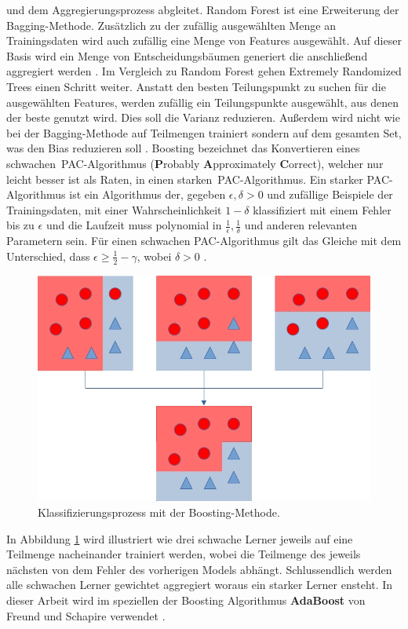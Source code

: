 und dem Aggregierungsprozess abgleitet.
\newline
\newline
Random Forest ist eine Erweiterung der Bagging-Methode. Zusätzlich zu der zufällig ausgewählten Menge an Trainingsdaten wird auch zufällig eine Menge von Features ausgewählt. Auf dieser Basis wird ein Menge von
Entscheidungsbäumen generiert die anschließend aggregiert werden \cite{breiman2001random}.
\newline
\newline
Im Vergleich zu Random Forest gehen Extremely Randomized Trees einen Schritt weiter. Anstatt den besten Teilungspunkt zu suchen für die ausgewählten Features, werden zufällig ein Teilungspunkte ausgewählt, aus denen
der beste genutzt wird. Dies soll die Varianz reduzieren. Außerdem wird nicht wie bei der Bagging-Methode auf Teilmengen trainiert sondern auf dem gesamten Set, was den Bias reduzieren soll \cite{geurts2006extremely}.
\newline
\newline
Boosting bezeichnet das Konvertieren eines \glqq schwachen\grqq\ PAC-Algorithmus (\textbf{P}robably \textbf{A}pproximately \textbf{C}orrect), welcher nur leicht besser ist als Raten, in einen \glqq starken\grqq\
PAC-Algorithmus. Ein starker PAC-Algorithmus ist ein Algorithmus der, gegeben $\epsilon, \delta > 0$ und zufällige Beispiele der Trainingsdaten, mit einer Wahrscheinlichkeit $1 - \delta$
klassifiziert mit einem Fehler bis zu $\epsilon$ und die Laufzeit muss polynomial in $\frac{1}{\epsilon}, \frac{1}{\delta}$ und anderen relevanten Parametern sein. Für einen schwachen PAC-Algorithmus gilt das Gleiche
mit dem Unterschied, dass $\epsilon \geq \frac{1}{2} - \gamma$, wobei $\delta > 0$ \cite{freund1997decision}.
\newline
\newline
\begin{figure}
    \centering
    \includegraphics[width=0.6\linewidth]{images/boosting.jpg}
    \caption{Klassifizierungsprozess mit der Boosting-Methode.}
    \label{fig:boosting}
\end{figure}
In Abbildung \ref{fig:boosting} wird illustriert wie drei schwache Lerner jeweils auf eine Teilmenge nacheinander trainiert werden, wobei die Teilmenge des jeweils nächsten von dem Fehler des vorherigen Models abhängt.
Schlussendlich werden alle schwachen Lerner gewichtet aggregiert woraus ein starker Lerner ensteht. In dieser Arbeit wird im speziellen der Boosting Algorithmus \textbf{AdaBoost} von Freund und Schapire verwendet \cite{freund1997decision}.